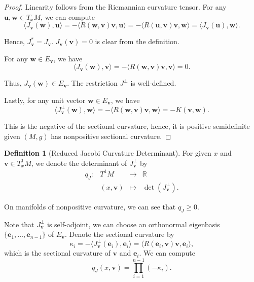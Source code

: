 \documentclass[reqno,11pt]{article}
\theoremstyle{definition}
\newtheorem{definition}{Definition}[section]
\theoremstyle{remark}
\numberwithin{equation}{section}
\begin{document}
\begin{proof}
	Linearity follows from the Riemannian curvature tensor. For any $\bm{u},\bm{w}\in T_{x}M$, we can compute
	\begin{displaymath}
		\langle J_{\bm{v}}(\bm{w}),\bm{u}\rangle=-\langle R(\bm{w},\bm{v})\bm{v},\bm{u}\rangle=-\langle R(\bm{u},\bm{v})\bm{v},\bm{w}\rangle= \langle J_{\bm{v}}(\bm{u}),\bm{w}\rangle.
	\end{displaymath}

	Hence, $J^{\ast}_{\bm{v}}=J_{\bm{v}}$. $J_{\bm{v}}(\bm{v})=0$ is clear from the definition.

	For any $\bm{w}\in E_{\bm{v}}$, we have
	\begin{displaymath}
		\langle J_{\bm{v}}(\bm{w}),\bm{v}\rangle=-\langle R(\bm{w},\bm{v})\bm{v},\bm{v}\rangle=0.
	\end{displaymath}

	Thus, $J_{\bm{v}}(\bm{w})\in E_{\bm{v}}$. The restriction $J^{\perp}$ is well-defined.

	Lastly, for any unit vector $\bm{w}\in E_{\bm{v}}$, we have
	\begin{displaymath}
		\langle J^{\perp}_{\bm{v}}(\bm{w}),\bm{w}\rangle=-\langle R(\bm{w},\bm{v})\bm{v},\bm{w}\rangle=-K(\bm{v},\bm{w}).
	\end{displaymath}

	This is the negative of the sectional curvature, hence, it is positive semidefinite given $(M,g)$ has nonpositive sectional curvature.
\end{proof}

\begin{definition}[Reduced Jacobi Curvature Determinant]\label{def_5_3}
	For given $x$ and $\bm{v}\in T^{1}_{x}M$, we denote the determinant of $J^{\perp}_{\bm{v}}$ by
	\begin{displaymath}
		\begin{aligned}
			q_{J}: & T^{1}M     & \longrightarrow & \mathbb{R}                \\
			       & (x,\bm{v}) & \longmapsto     & \det(J^{\perp}_{\bm{v}}).
		\end{aligned}
	\end{displaymath}

	On manifolds of nonpositive curvature, we can see that $q_{J}\geq 0$.
\end{definition}

Note that $J^{\perp}_{\bm{v}}$ is self-adjoint, we can choose an orthonormal eigenbasis $\{\bm{e}_1,\ldots,\bm{e}_{n-1}\}$ of $E_{\bm{v}}$. Denote the sectional curvature by
\begin{displaymath}
	\kappa_{i}=-\langle J^{\perp}_{\bm{v}}(\bm{e}_i),\bm{e}_i\rangle=\langle R(\bm{e}_i,\bm{v})\bm{v},\bm{e}_i\rangle,
\end{displaymath}
which is the sectional curvature of $\bm{v}$ and $\bm{e}_i$. We can compute
\begin{equation}
	q_J(x,\bm{v})=\prod_{i=1}^{n-1}(-\kappa_{i}).
\end{equation}
\end{document}
